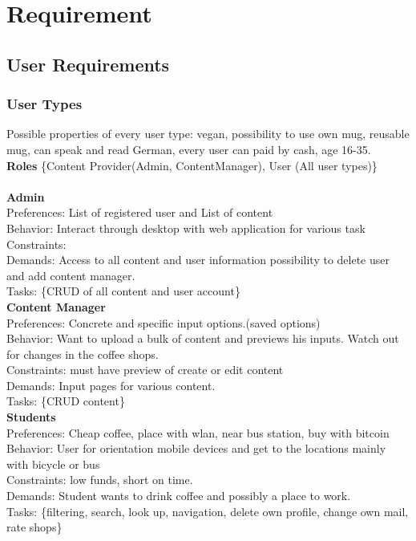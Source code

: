 \section{Requirement}
\subsection{User Requirements}
\subsubsection{User Types}
Possible properties of every user type: vegan, possibility to use own mug, reusable mug, can speak and read German, every user can paid by cash, age 16-35.\\
\textbf{Roles} \{Content Provider(Admin, ContentManager), User (All user types)\}\\\\
\textbf{Admin}\\
Preferences: List of registered user and List of content \\
Behavior: Interact through desktop with web application for various task\\
Constraints: \\
Demands: Access to all content and user information possibility to delete user and add content manager.\\
Tasks: \{CRUD of all content and user account\}\\
\textbf{Content Manager}\\
Preferences: Concrete and specific input options.(saved options)\\
Behavior: Want to upload a bulk of content and previews his inputs. Watch out for changes in the coffee shops.\\
Constraints:  must have preview of create or edit content\\
Demands: Input pages for various content.\\
Tasks: \{CRUD content\}\\
\textbf{Students}\\
Preferences: Cheap coffee, place with wlan, near bus station, buy with bitcoin\\
Behavior: User for orientation mobile devices and get to the locations mainly with bicycle or bus\\
Constraints:  low funds, short on time.\\
Demands: Student wants to drink coffee and possibly a place to work.\\
Tasks: \{filtering, search, look up, navigation, delete own profile, change own mail, rate shops\}\\

